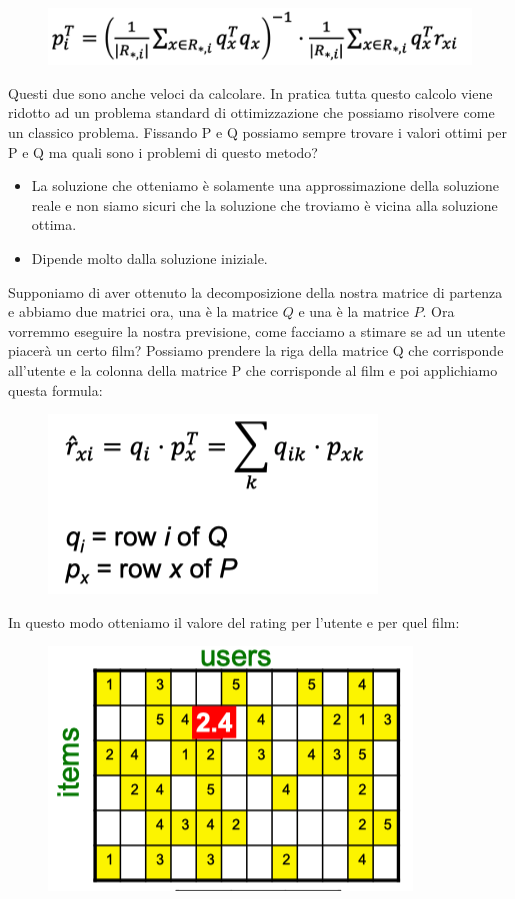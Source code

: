 \documentclass[14pt]{extreport}
\begin{document}
\begin{figure}[H] 
\centering
\includegraphics[width=0.7\linewidth]{522.jpeg}
\end{figure}

Questi due sono anche veloci da calcolare.
In pratica tutta questo calcolo viene ridotto ad un problema standard di ottimizzazione che possiamo risolvere come un classico problema.
Fissando P e Q possiamo sempre trovare i valori ottimi per P e Q ma quali sono i problemi di questo metodo?
\begin{itemize}
\item La soluzione che otteniamo è solamente una approssimazione della soluzione reale e non siamo sicuri che la soluzione che troviamo è 
vicina alla soluzione ottima.
\item Dipende molto dalla soluzione iniziale.
\end{itemize}

Supponiamo di aver ottenuto la decomposizione della nostra matrice di partenza e abbiamo due matrici ora, una è la matrice $Q$ e una è la matrice $P$.
Ora vorremmo eseguire la nostra previsione, come facciamo a stimare se ad un utente piacerà un certo film?
Possiamo prendere la riga della matrice Q che corrisponde all'utente e la colonna della matrice P che corrisponde al film e poi applichiamo questa formula:

\begin{figure}[H] 
\centering
\includegraphics[width=0.7\linewidth]{523.jpeg}
\end{figure}

In questo modo otteniamo il valore del rating per l'utente e per quel film:


\begin{figure}[H] 
\centering
\includegraphics[width=0.4\linewidth]{524.jpeg}
\end{figure}
\end{document}
